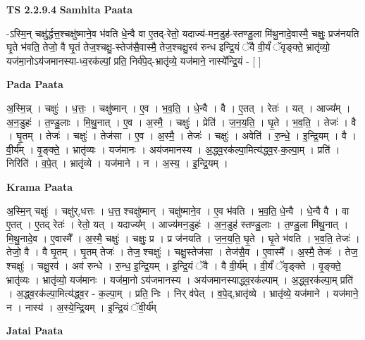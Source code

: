 \documentclass[17pt]{extarticle}
\begin{document}
\textbf{TS 2.2.9.4 } \newline
\textbf{Samhita Paata} \newline

-ऽस्मि॒न् चक्षु॑र्द्धत्त॒श्चक्षु॑ष्माने॒व भ॑वति धे॒न्वै वा ए॒तद्-रेतो॒ यदाज्य॑-मन॒डुह॑-स्तण्डु॒ला मि॑थु॒नादे॒वास्मै॒ चक्षुः॒ प्रज॑नयति घृ॒ते भ॑वति॒ तेजो॒ वै घृ॒तं तेज॒श्चक्षु॒-स्तेज॑सै॒वास्मै॒ तेज॒श्चक्षु॒रव॑ रुन्ध इन्द्रि॒यं ॅवै वी॒र्यं॑ ॅवृङ्क्ते॒ भ्रातृ॑व्यो॒ यज॑मा॒नोऽय॑जमानस्या-ध्व॒रक॑ल्पां॒ प्रति॒ निर्व॑पे॒द्-भ्रातृ॑व्ये॒ यज॑माने॒ नास्ये᳚न्द्रि॒यं - [  ] \newline

\textbf{Pada Paata} \newline

अ॒स्मि॒न्न् । चक्षुः॑ । ध॒त्तः॒ । चक्षु॑ष्मान् । ए॒व । भ॒व॒ति॒ । धे॒न्वै । वै । ए॒तत् । रेतः॑ । यत् । आज्य᳚म् । अ॒न॒डुहः॑ । त॒ण्डु॒लाः । मि॒थु॒नात् । ए॒व । अ॒स्मै॒ । चक्षुः॑ । प्रेति॑ । ज॒न॒य॒ति॒ । घृ॒ते । भ॒व॒ति॒ । तेजः॑ । वै । घृ॒तम् । तेजः॑ । चक्षुः॑ । तेज॑सा । ए॒व । अ॒स्मै॒ । तेजः॑ । चक्षुः॑ । अवेति॑ । रु॒न्धे॒ । इ॒न्द्रि॒यम् । वै । वी॒र्य᳚म् । वृ॒ङ्क्ते॒ । भ्रातृ॑व्यः । यज॑मानः । अय॑जमानस्य । अ॒द्ध्व॒रक॑ल्पा॒मित्य॑द्ध्व॒र-क॒ल्पा॒म् । प्रति॑ । निरिति॑ । व॒पे॒त् । भ्रातृ॑व्ये । यज॑माने । न । अ॒स्य॒ । इ॒न्द्रि॒यम् ।  \newline


\textbf{Krama Paata} \newline

अ॒स्मि॒न् चक्षुः॑ । चक्षु॑र्,धत्तः । ध॒त्त॒ श्चक्षु॑ष्मान् । चक्षु॑ष्माने॒व । ए॒व भ॑वति । भ॒व॒ति॒ धे॒न्वै । धे॒न्वै वै । वा ए॒तत् । ए॒तद् रेतः॑ । रेतो॒ यत् । यदाज्य᳚म् । आज्य॑मन॒डुहः॑ । अ॒न॒डुह॑ स्तण्डु॒लाः । त॒ण्डु॒ला मि॑थु॒नात् । मि॒थु॒नादे॒व । ए॒वास्मै᳚ । अ॒स्मै॒ चक्षुः॑ । चक्षुः॒ प्र । प्र ज॑नयति । ज॒न॒य॒ति॒ घृ॒ते । घृ॒ते भ॑वति । भ॒व॒ति॒ तेजः॑ । तेजो॒ वै । वै घृ॒तम् । घृ॒तम् तेजः॑ । तेज॒ श्चक्षुः॑ । चक्षु॒स्तेज॑सा । तेज॑सै॒व । ए॒वास्मै᳚ । अ॒स्मै॒ तेजः॑ । तेज॒ श्चक्षुः॑ । चक्षु॒रव॑ । अव॑ रुन्धे । रु॒न्ध॒ इ॒न्द्रि॒यम् । इ॒न्द्रि॒यं ॅवै । वै वी॒र्य᳚म् । वी॒र्यं॑ ॅवृङ्क्ते । वृ॒ङ्क्ते॒ भ्रातृ॑व्यः । भ्रातृ॑व्यो॒ यज॑मानः । यज॑मा॒नो ऽय॑जमानस्य । अय॑जमानस्याद्ध्व॒रक॑ल्पाम् । अ॒द्ध्व॒रक॑ल्पा॒म् प्रति॑ । अ॒द्ध्व॒रक॑ल्पा॒मित्य॑द्ध्व॒र - क॒ल्पा॒म् । प्रति॒ निः । निर् व॑पेत् । व॒पे॒द्,भ्रातृ॑व्ये । भ्रातृ॑व्ये॒ यज॑माने । यज॑माने॒ न । नास्य॑ । अ॒स्ये॒न्द्रि॒यम् । इ॒न्द्रि॒यं ॅवी॒र्य᳚म् \newline

\textbf{Jatai Paata} \newline
\end{document}
